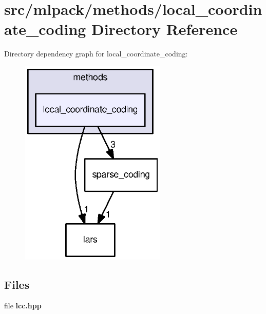\section{src/mlpack/methods/local\+\_\+coordinate\+\_\+coding Directory Reference}
\label{dir_c1c3e6335c59af7e410ebd40d35e32f8}
Directory dependency graph for local\+\_\+coordinate\+\_\+coding\+:
\nopagebreak
\begin{figure}[H]
\begin{center}
\leavevmode
\includegraphics[width=198pt]{dir_c1c3e6335c59af7e410ebd40d35e32f8_dep}
\end{center}
\end{figure}
\subsection*{Files}
\begin{DoxyCompactItemize}
\item 
file {\bf lcc.\+hpp}
\end{DoxyCompactItemize}
